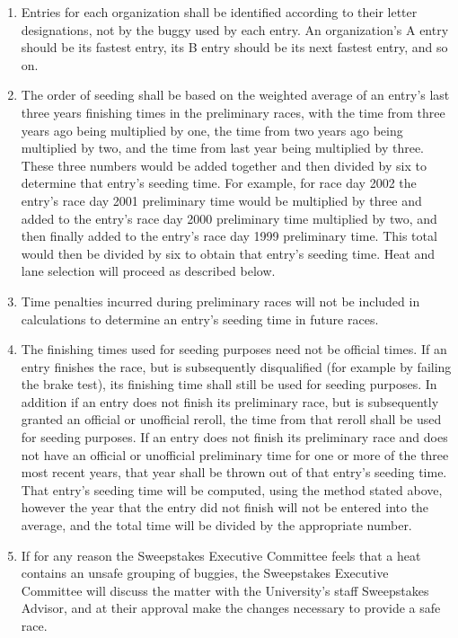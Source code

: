 	\begin{enumerate}

		\item Entries for each organization shall be identified according to their letter designations, not by the buggy used by each entry. An organization's A entry should be its fastest entry, its B entry should be its next fastest entry, and so on.

		\item The order of seeding shall be based on the weighted average of an entry’s last three years finishing times in the preliminary races, with the time from three years ago being multiplied by one, the time from two years ago being multiplied by two, and the time from last year being multiplied by three. These three numbers would be added together and then divided by six to determine that entry’s seeding time. For example, for race day 2002 the entry’s race day 2001 preliminary time would be multiplied by three and added to the entry’s race day 2000 preliminary time multiplied by two, and then finally added to the entry’s race day 1999 preliminary time. This total would then be divided by six to obtain that entry’s seeding time. Heat and lane selection will proceed as described below.

        \item Time penalties incurred during preliminary races will not be included in calculations to determine an entry’s seeding time in future races.

		\item The finishing times used for seeding purposes need not be official times. If an entry finishes the race, but is subsequently disqualified (for example by failing the brake test), its finishing time shall still be used for seeding purposes. In addition if an entry does not finish its preliminary race, but is subsequently granted an official or unofficial reroll, the time from that reroll shall be used for seeding purposes. If an entry does not finish its preliminary race and does not have an official or unofficial preliminary time for one or more of the three most recent years, that year shall be thrown out of that entry's seeding time. That entry's seeding time will be computed, using the method stated above, however the year that the entry did not finish will not be entered into the average, and the total time will be divided by the appropriate number.

		\item If for any reason the Sweepstakes Executive Committee feels that a heat contains an unsafe grouping of buggies, the Sweepstakes Executive Committee will discuss the matter with the University's staff Sweepstakes Advisor, and at their approval make the changes necessary to provide a safe race.

	\end{enumerate}

